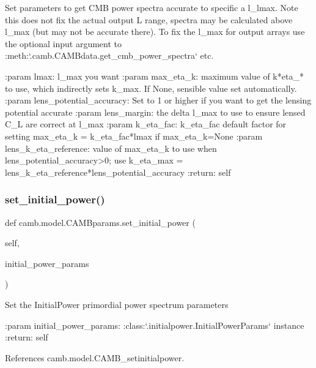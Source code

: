 \begin{DoxyVerb}Set parameters to get CMB power spectra accurate to specific a l_lmax.
Note this does not fix the actual output L range, spectra may be calculated above l_max (but may not be accurate there).
To fix the l_max for output arrays use the optional input argument to :meth:`.camb.CAMBdata.get_cmb_power_spectra` etc.

:param lmax: l_max you want
:param max_eta_k: maximum value of k*eta_* to use, which indirectly sets k_max. If None, sensible value set automatically.
:param lens_potential_accuracy: Set to 1 or higher if you want to get the lensing potential accurate
:param lens_margin: the delta l_max to use to ensure lensed C_L are correct at l_max
:param k_eta_fac:  k_eta_fac default factor for setting max_eta_k = k_eta_fac*lmax if max_eta_k=None
:param lens_k_eta_reference:  value of max_eta_k to use when lens_potential_accuracy>0; use k_eta_max = lens_k_eta_reference*lens_potential_accuracy
:return: self
\end{DoxyVerb}
 \mbox{\label{classcamb_1_1model_1_1CAMBparams_a02d9cef6eef7569886bd8625e4d465f6}} 
\subsubsection{\texorpdfstring{set\+\_\+initial\+\_\+power()}{set\_initial\_power()}}
{\footnotesize\ttfamily def camb.\+model.\+C\+A\+M\+Bparams.\+set\+\_\+initial\+\_\+power (\begin{DoxyParamCaption}\item[{}]{self,  }\item[{}]{initial\+\_\+power\+\_\+params }\end{DoxyParamCaption})}

\begin{DoxyVerb}Set the InitialPower primordial power spectrum parameters

:param initial_power_params: :class:`.initialpower.InitialPowerParams` instance
:return: self
\end{DoxyVerb}
 

References camb.\+model.\+C\+A\+M\+B\+\_\+setinitialpower.

